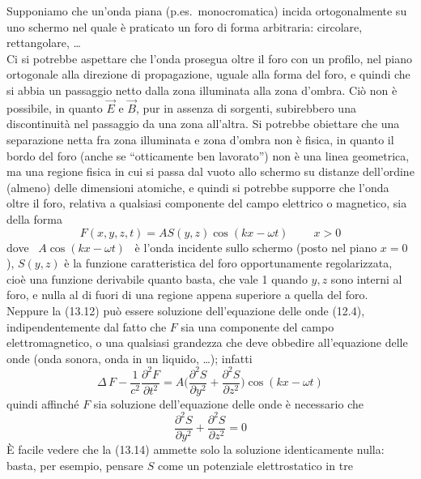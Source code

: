 Supponiamo che un'onda piana (p.es.\ monocromatica) incida ortogonalmente su uno
schermo nel quale \`e praticato un foro di forma arbitraria: circolare,
rettangolare, \dots\\
Ci si potrebbe aspettare che l'onda prosegua oltre il foro con un profilo, nel
piano ortogonale alla direzione di propagazione, uguale alla forma del foro, e
quindi che si abbia un passaggio netto dalla zona illuminata alla zona d'ombra.
Ci\`o non \`e possibile, in quanto $\vec E$ e $\vec B$, pur in assenza di
sorgenti, subirebbero una discontinuit\`a nel passaggio da una zona all'altra.
Si potrebbe obiettare che una separazione netta fra zona illuminata e zona
d'ombra non \`e fisica, in quanto il bordo del foro (anche se ``otticamente ben
lavorato'') non \`e una linea geometrica, ma una regione fisica in cui si passa
dal vuoto
allo schermo su distanze dell'ordine (almeno) delle dimensioni atomiche, e
quindi si potrebbe supporre che l'onda oltre il foro, relativa a qualsiasi
componente del campo elettrico o magnetico, sia della forma
\begin{equation}
  F(x,y,z,t)=AS(y,z)\cos(kx-\omega t)\qquad\ x>0
  \tag{13.12}
\end{equation}
dove \ $A\cos(kx-\omega t)$ \ \`e l'onda incidente sullo schermo (posto nel
piano $x=0$), $S(y,z)$ \`e la funzione caratteristica del foro opportunamente
regolarizzata, cio\`e una funzione derivabile quanto basta, che vale 1 quando
$y,z$ sono interni al foro, e nulla al di fuori di una regione appena superiore
a quella del foro.\\
Neppure la (13.12) pu\`o essere soluzione dell'equazione delle onde (12.4),
indipendentemente dal fatto che $F$ sia una componente del campo
elettromagnetico, o una qualsiasi grandezza che deve obbedire all'equazione
delle onde (onda sonora, onda in un liquido, \dots); infatti
\begin{equation}
  \Delta\,F-\frac{1}{c^2}\frac{\partial^2F}{\partial t^2}
  =A\Big(\frac{\partial^2S}{\partial y^2}+\frac{\partial^2S}{\partial z^2}\Big)
  \cos(kx-\omega t)
  \tag{13.13}
\end{equation}
quindi affinch\'e $F$ sia soluzione dell'equazione delle onde \`e necessario che
\begin{equation}
  \frac{\partial^2S}{\partial y^2}+\frac{\partial^2S}{\partial z^2}=0
  \tag{13.14}
\end{equation}
\`E facile vedere che la (13.14) ammette solo la soluzione identicamente nulla:
basta, per esempio, pensare $S$ come un potenziale elettrostatico in tre
